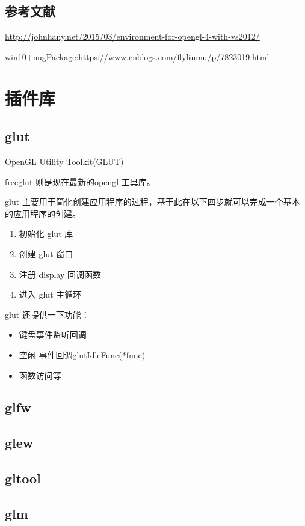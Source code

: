 \documentclass[UTF8,a4paper,12pt]{ctexbook}
\begin{document}
    \section{参考文献} 
    \url{http://johnhany.net/2015/03/environment-for-opengl-4-with-vs2012/}    
    
    win10+nugPackage:\url{https://www.cnblogs.com/flylinmu/p/7823019.html}
    

\newpage
\chapter{插件库}
	\section{glut}
		OpenGL Utility Toolkit(GLUT)
		
		
		freeglut 则是现在最新的opengl 工具库。
		
		glut 主要用于简化创建应用程序的过程，基于此在以下四步就可以完成一个基本的应用程序的创建。
		\begin{enumerate}
			\item 初始化 glut 库
			\item 创建 glut 窗口
			\item 注册 display 回调函数
			\item 进入 glut 主循环
		\end{enumerate}
		
		glut 还提供一下功能：
		\begin{itemize}
			\item 键盘事件监听回调
			\item 空闲 事件回调glutIdleFunc(*func)
			\item 函数访问等
		\end{itemize}
		
		
	\section{glfw}
	
	
	\section{glew}
	
	
	\section{gltool}
	
	
	\section{glm}
\end{document}

